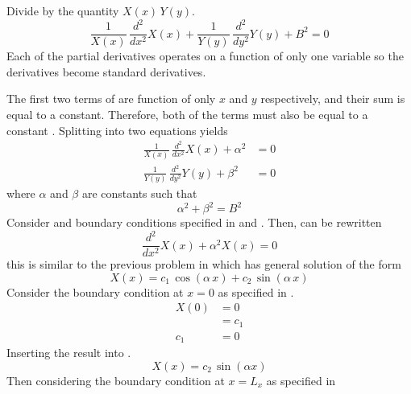   Divide  by the quantity $X(x)\,Y(y)$.
  \begin{equation}
    \label{eq:2d1g_divide_sum}
    \frac{1}{X(x)} \, \frac{d^2}{d x^2} X(x) + 
      \frac{1}{Y(y)} \, \frac{d^2}{d y^2} Y(y) + 
      B^2 = 0
  \end{equation}
  Each of the partial derivatives operates on a function of only one variable so
  the derivatives become standard derivatives.

  The first two terms of  are function of only $x$ and
  $y$ respectively, and their sum is equal to a constant. Therefore, both of the
  terms must also be equal to a constant \cite{lamarsh1966}. Splitting
   into two equations yields
  \begin{align}
    \label{eq:2d1g_x}
    \frac{1}{X(x)} \, \frac{d^2}{d x^2} X(x) + \alpha^2 &= 0 \\
    \label{eq:2d1g_y}
    \frac{1}{Y(y)} \, \frac{d^2}{d y^2} Y(y) + \beta^2 &= 0
  \end{align}
  where $\alpha$ and $\beta$ are constants such that
  \begin{equation}
    \label{eq:2d1g_buckle_alphabeta}
    \alpha^2 + \beta^2 = B^2
  \end{equation}
  Consider  and boundary conditions specified in
   and . Then,  can be
  rewritten
  \begin{equation}
    \frac{d^2}{dx^2} X(x) + \alpha^2 X(x) = 0
  \end{equation}
  this is similar to the previous problem in  which has 
  general solution of the form
  \begin{equation}
    \label{eq:2d1g_x_general}
    X(x) = c_1 \, \cos(\alpha \, x) + c_2 \, \sin(\alpha \, x)
  \end{equation}
  Consider the boundary condition at $x=0$ as specified in .
  \begin{align}
    X(0) &= 0 \\
    &= c_1 \\
    \label{eq:2d1g_x_c1}
    c_1 &= 0
  \end{align}
  Inserting the result  into .
  \begin{equation}
    \label{eq:2d1g_x_sin}
    X(x) = c_2 \, \sin( \alpha x)
  \end{equation}
  Then considering the boundary condition at $x=L_x$ as specified in
